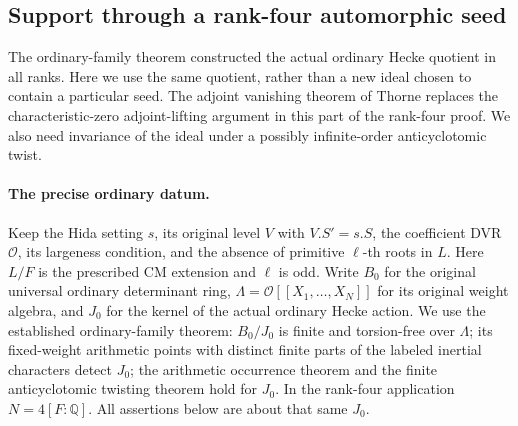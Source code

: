 \subsection{Support through a rank-four automorphic seed}
\label{subsec:rh-rank-four-seed-support}

The ordinary-family theorem constructed the actual ordinary Hecke quotient
in all ranks. Here we use the same quotient, rather than a new ideal
chosen to contain a particular seed. The adjoint vanishing theorem of
Thorne replaces the characteristic-zero adjoint-lifting argument in this
part of the rank-four proof. We also need invariance of the ideal under a
possibly infinite-order anticyclotomic twist.

\paragraph{The precise ordinary datum.}
Keep the Hida setting $s$, its original level $V$ with $V.S'=s.S$, the
coefficient DVR $\mathcal O$, its largeness condition, and the absence of
primitive $\ell$-th roots in $L$. Here $L/F$ is the prescribed CM extension
and $\ell$ is odd. Write $B_0$ for the original universal ordinary
determinant ring, $\Lambda=\mathcal O[[X_1,\ldots,X_N]]$ for its original
weight algebra, and $J_0$ for the kernel of the actual ordinary Hecke
action. We use the established ordinary-family theorem: $B_0/J_0$ is
finite and torsion-free over $\Lambda$; its fixed-weight arithmetic
points with distinct finite parts of the labeled inertial characters
detect $J_0$; the arithmetic occurrence theorem and the finite
anticyclotomic twisting theorem hold for $J_0$. In the rank-four
application $N=4[F:\mathbb Q]$. All assertions below are about that same
$J_0$.

